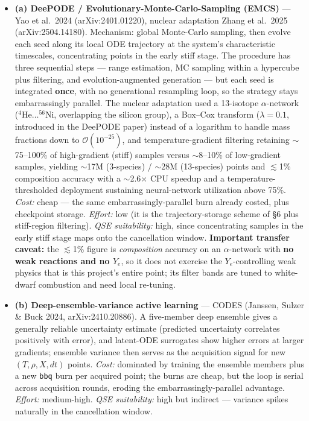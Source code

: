 \documentclass[11pt]{article}
\newcommand{\bbq}{\texttt{bbq}}
\begin{document}
\begin{itemize}
\item \textbf{(a) DeePODE / Evolutionary-Monte-Carlo-Sampling (EMCS)} --- Yao et al.\ 2024 (arXiv:2401.01220), nuclear adaptation Zhang et al.\ 2025 (arXiv:2504.14180). Mechanism: global Monte-Carlo sampling, then evolve each seed along its local ODE trajectory at the system's characteristic timescales, concentrating points in the early stiff stage. The procedure has three sequential steps --- range estimation, MC sampling within a hypercube plus filtering, and evolution-augmented generation --- but each seed is integrated \textbf{once}, with no generational resampling loop, so the strategy stays embarrassingly parallel. The nuclear adaptation used a 13-isotope $\alpha$-network (${}^{4}\mathrm{He}\dots{}^{56}\mathrm{Ni}$, overlapping the silicon group), a Box--Cox transform ($\lambda = 0.1$, introduced in the DeePODE paper) instead of a logarithm to handle mass fractions down to $\mathcal{O}(10^{-25})$, and temperature-gradient filtering retaining $\sim$75--100\% of high-gradient (stiff) samples versus $\sim$8--10\% of low-gradient samples, yielding $\sim$17M (3-species) / $\sim$28M (13-species) points and $\lesssim$1\% composition accuracy with a $\sim$2.6$\times$ CPU speedup and a temperature-thresholded deployment sustaining neural-network utilization above 75\%. \emph{Cost:} cheap --- the same embarrassingly-parallel burn already costed, plus checkpoint storage. \emph{Effort:} low (it is the trajectory-storage scheme of \S6 plus stiff-region filtering). \emph{QSE suitability:} high, since concentrating samples in the early stiff stage maps onto the cancellation window. \textbf{Important transfer caveat:} the $\lesssim$1\% figure is \emph{composition} accuracy on an $\alpha$-network with \textbf{no weak reactions and no $Y_e$}, so it does not exercise the $Y_e$-controlling weak physics that is this project's entire point; its filter bands are tuned to white-dwarf combustion and need local re-tuning.
\item \textbf{(b) Deep-ensemble-variance active learning} --- CODES (Janssen, Sulzer \& Buck 2024, arXiv:2410.20886). A five-member deep ensemble gives a generally reliable uncertainty estimate (predicted uncertainty correlates positively with error), and latent-ODE surrogates show higher errors at larger gradients; ensemble variance then serves as the acquisition signal for new $(T, \rho, X, dt)$ points. \emph{Cost:} dominated by training the ensemble members plus a new \bbq{} burn per acquired point; the burns are cheap, but the loop is serial across acquisition rounds, eroding the embarrassingly-parallel advantage. \emph{Effort:} medium-high. \emph{QSE suitability:} high but indirect --- variance spikes naturally in the cancellation window.

\end{itemize}
\end{document}
